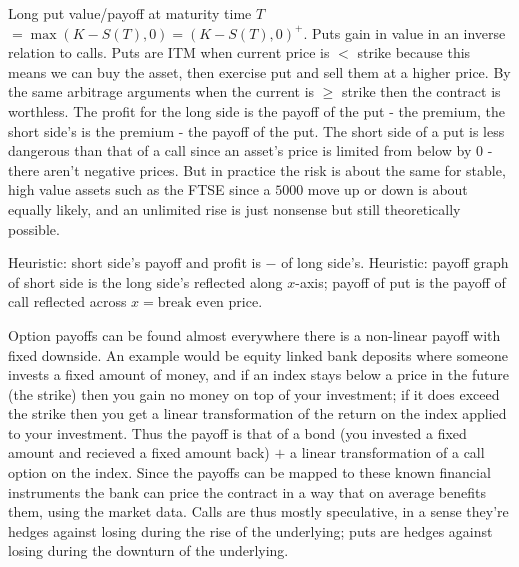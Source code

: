 \documentclass[9pt]{extarticle}
\begin{document}
Long put value/payoff at maturity time $T$ $= \operatorname{max}(K-S(T),0)=(K-S(T),0)^+$. Puts 
gain in value in an inverse relation to calls. Puts are ITM when 
current price is $<$ strike because this means we can buy the asset, then exercise put and sell them 
at a higher price. By the same arbitrage arguments when the current is $\geq$ strike then 
the contract is worthless. The profit for the long side is the 
payoff of the put - the premium, the short side's is the premium - the payoff of the put. The short 
side of a put is less dangerous than that of a call since an asset's price is limited from below by $0$ - there 
aren't negative prices. But in practice the risk is about the same for stable, high value assets such 
as the FTSE since a $5000$ move up or down is about equally likely, and an unlimited rise is just 
nonsense but still theoretically possible.


Heuristic: short side's payoff and profit is $-$ of long side's.
Heuristic: payoff graph of short side is the long side's reflected along $x$-axis; payoff of put 
is the payoff of call reflected across $x=\text{break even price}$. 


Option payoffs can be found almost everywhere there is a non-linear payoff with fixed downside. An example 
would be equity linked bank deposits where someone invests a fixed amount of money, 
and if an index stays below a price in the future (the strike) then you gain no money on top 
of your investment; if it does exceed the strike then you get a linear transformation of the 
return on the index applied to your investment. Thus the payoff is that of a bond (you invested a fixed amount 
and recieved a fixed amount back) $+$ a linear 
transformation of a call option on the index. Since the payoffs can be mapped 
to these known financial instruments the bank can price the 
contract in a way that on average benefits them, 
using the market data. Calls are thus mostly 
speculative, in a sense they're hedges against losing 
during the rise of the underlying; puts are hedges against losing during the downturn of the 
underlying.
\end{document}
